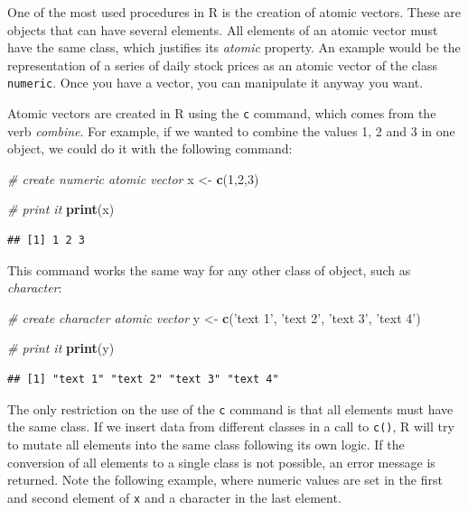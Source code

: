 \documentclass[11pt,]{book}
\newenvironment{Shaded}{\begin{snugshade}}{\end{snugshade}}
\newcommand{\KeywordTok}[1]{\textcolor[rgb]{0.27,0.27,0.27}{\textbf{#1}}}
\newcommand{\DecValTok}[1]{\textcolor[rgb]{0.06,0.06,0.06}{#1}}
\newcommand{\StringTok}[1]{\textcolor[rgb]{0.5,0.5,0.5}{#1}}
\newcommand{\CommentTok}[1]{\textcolor[rgb]{0.56,0.35,0.01}{\textit{#1}}}
\newcommand{\NormalTok}[1]{#1}
\begin{document}
One of the most used procedures in R is the creation of atomic vectors.
These are objects that can have several elements. All elements of an
atomic vector must have the same class, which justifies its
\emph{atomic} property. An example would be the representation of a
series of daily stock prices as an atomic vector of the class
\texttt{numeric}. Once you have a vector, you can manipulate it anyway
you want.

Atomic vectors are created in R using the \texttt{c} command, which
comes from the verb \emph{combine}. For example, if we wanted to combine
the values 1, 2 and 3 in one object, we could do it with the following
command: 

\begin{Shaded}
\begin{Highlighting}[]
\CommentTok{# create numeric atomic vector}
\NormalTok{x <-}\StringTok{ }\KeywordTok{c}\NormalTok{(}\DecValTok{1}\NormalTok{,}\DecValTok{2}\NormalTok{,}\DecValTok{3}\NormalTok{)}

\CommentTok{# print it}
\KeywordTok{print}\NormalTok{(x)}
\end{Highlighting}
\end{Shaded}

\begin{verbatim}
## [1] 1 2 3
\end{verbatim}

This command works the same way for any other class of object, such as
\emph{character}:

\begin{Shaded}
\begin{Highlighting}[]
\CommentTok{# create character atomic vector}
\NormalTok{y <-}\StringTok{ }\KeywordTok{c}\NormalTok{(}\StringTok{'text 1'}\NormalTok{, }\StringTok{'text 2'}\NormalTok{, }\StringTok{'text 3'}\NormalTok{, }\StringTok{'text 4'}\NormalTok{)}

\CommentTok{# print it}
\KeywordTok{print}\NormalTok{(y)}
\end{Highlighting}
\end{Shaded}

\begin{verbatim}
## [1] "text 1" "text 2" "text 3" "text 4"
\end{verbatim}

The only restriction on the use of the \texttt{c} command is that all
elements must have the same class. If we insert data from different
classes in a call to \texttt{c()}, R will try to mutate all elements
into the same class following its own logic. If the conversion of all
elements to a single class is not possible, an error message is
returned. Note the following example, where numeric values are set in
the first and second element of \texttt{x} and a character in the last
element.
\end{document}
